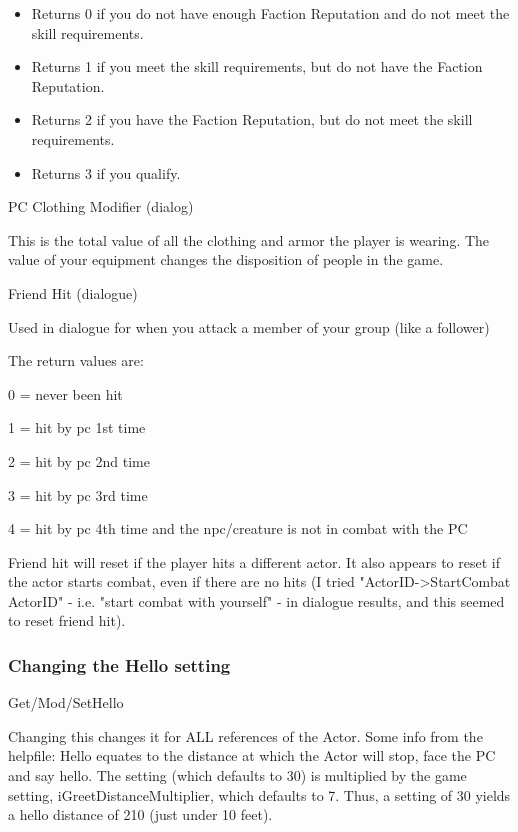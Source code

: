 \documentclass[
]{article}
\begin{document}
\begin{itemize}
\item
  Returns 0 if you do not have enough Faction Reputation and do not meet
  the skill requirements.
\item
  Returns 1 if you meet the skill requirements, but do not have the
  Faction Reputation.
\item
  Returns 2 if you have the Faction Reputation, but do not meet the
  skill requirements.
\item
  Returns 3 if you qualify.
\end{itemize}

PC Clothing Modifier (dialog)

This is the total value of all the clothing and armor the player is
wearing. The value of your equipment changes the disposition of people
in the game.

Friend Hit (dialogue)

Used in dialogue for when you attack a member of your group (like a
follower)

The return values are:

0 = never been hit

1 = hit by pc 1st time

2 = hit by pc 2nd time

3 = hit by pc 3rd time

4 = hit by pc 4th time and the npc/creature is not in combat with the PC

Friend hit will reset if the player hits a different actor. It also
appears to reset if the actor starts combat, even if there are no hits
(I tried "ActorID-\textgreater StartCombat ActorID" - i.e. "start combat
with yourself" - in dialogue results, and this seemed to reset friend
hit).

\hypertarget{changing-the-hello-setting}{%
\subsubsection{Changing the Hello
setting}\label{changing-the-hello-setting}}

Get/Mod/SetHello

Changing this changes it for ALL references of the Actor. Some info from
the helpfile: Hello equates to the distance at which the Actor will
stop, face the PC and say hello. The setting (which defaults to 30) is
multiplied by the game setting, iGreetDistanceMultiplier, which defaults
to 7. Thus, a setting of 30 yields a hello distance of 210 (just under
10 feet).
\end{document}
